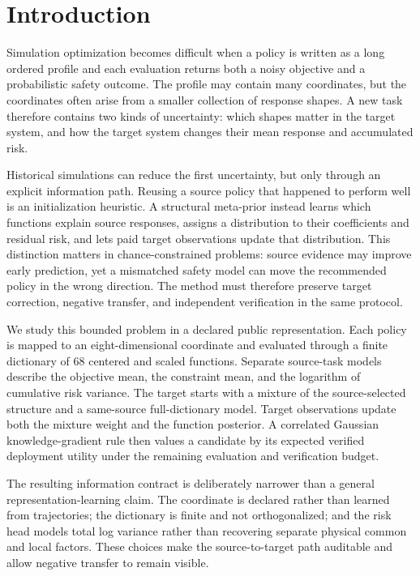 \section{Introduction}\label{sec:meta_prior_introduction}

Simulation optimization becomes difficult when a policy is written as a long
ordered profile and each evaluation returns both a noisy objective and a
probabilistic safety outcome.  The profile may contain many coordinates, but
the coordinates often arise from a smaller collection of response shapes.  A
new task therefore contains two kinds of uncertainty: which shapes matter in
the target system, and how the target system changes their mean response and
accumulated risk.

Historical simulations can reduce the first uncertainty, but only through an
explicit information path.  Reusing a source policy that happened to perform
well is an initialization heuristic.  A structural meta-prior instead learns
which functions explain source responses, assigns a distribution to their
coefficients and residual risk, and lets paid target observations update that
distribution.  This distinction matters in chance-constrained problems:
source evidence may improve early prediction, yet a mismatched safety model
can move the recommended policy in the wrong direction.  The method must
therefore preserve target correction, negative transfer, and independent
verification in the same protocol.

We study this bounded problem in a declared public representation.  Each
policy is mapped to an eight-dimensional coordinate and evaluated through a
finite dictionary of 68 centered and scaled functions.  Separate source-task
models describe the objective mean, the constraint mean, and the logarithm of
cumulative risk variance.  The target starts with a mixture of the
source-selected structure and a same-source full-dictionary model.  Target
observations update both the mixture weight and the function posterior.  A
correlated Gaussian knowledge-gradient rule then values a candidate by its
expected verified deployment utility under the remaining evaluation and
verification budget.

The resulting information contract is deliberately narrower than a general
representation-learning claim.  The coordinate is declared rather than
learned from trajectories; the dictionary is finite and not orthogonalized;
and the risk head models total log variance rather than recovering separate
physical common and local factors.  These choices make the source-to-target
path auditable and allow negative transfer to remain visible.

